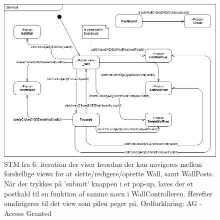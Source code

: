 \begin{figure}[H]
  \includegraphics[width=1.0\linewidth]{01_Billeder/09_Arkitektur/Wall_STM.jpg}
  \caption{STM fra 6. iteration der viser hvordan der kan navigeres mellem forskellige views for at slette/redigere/oprette Wall, samt WallPosts. Når der trykkes på 'submit' knappen i et pop-up, laves der et postkald til en funktion af samme navn i WallControlleren. Herefter omdirigeres til det view som pilen peger på. Ordforklaring: AG - Access Granted}
  \label{fig:Wall_STM}
\end{figure}













